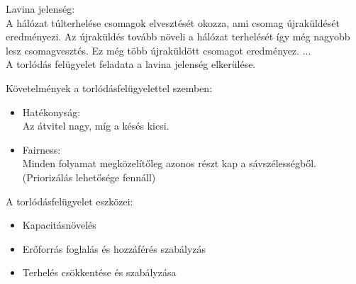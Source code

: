 \documentclass[margin=0px]{article}
\begin{document}
\begin{description}
        Lavina jelenség: \\
        A hálózat túlterhelése csomagok elvesztését okozza, ami csomag újraküldését eredményezi. Az újraküldés tovább növeli a hálózat terhelését így még nagyobb lesz csomagvesztés. Ez még több újraküldött csomagot eredményez. ... \\
        A torlódás felügyelet feladata a lavina jelenség elkerülése.

        Követelmények a torlódásfelügyelettel szemben:
        \begin{itemize}
            \item Hatékonyság: \\
                  Az átvitel nagy, míg a késés kicsi.
            \item Fairness: \\
                  Minden folyamat megközelítőleg azonos részt kap a sávszélességből. (Priorizálás lehetősége fennáll)
        \end{itemize}

        A torlódásfelügyelet eszközei:
        \begin{itemize}
            \item Kapacitásnövelés
            \item Erőforrás foglalás és hozzáférés szabályzás
            \item Terhelés csökkentése és szabályzása
        \end{itemize}


\end{description}
\end{document}
